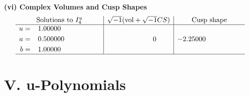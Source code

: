 \documentclass[1p]{elsarticle_modified}
\theoremstyle{definition}
\newcommand{\I}{\sqrt{-1}}
\begin{document}
\newpage\flushleft \textbf{(vi) Complex Volumes and Cusp Shapes}
$$\begin{array}{c|c|c}  
\text{Solutions to }I^u_{4}& \I (\text{vol} + \sqrt{-1}CS) & \text{Cusp shape}\\
 \hline 
\begin{aligned}
u &= \phantom{-}1.00000\phantom{ +0.000000I} \\
a &= \phantom{-}0.500000\phantom{ +0.000000I} \\
b &= \phantom{-}1.00000\phantom{ +0.000000I}\end{aligned}
 & \phantom{-0.000000 } 0 & -2.25000\phantom{ +0.000000I}\\
 \hline 
 \end{array}$$\newpage
\newpage\renewcommand{\arraystretch}{1}
\centering \section*{ V. u-Polynomials}
\end{document}
